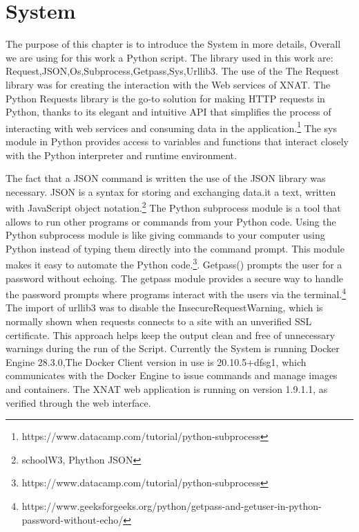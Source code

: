 \chapter{System}
The purpose of this chapter is to introduce the System in more details, Overall we are using for this work a Python script. The library  used in this work are: Request,JSON,Os,Subprocess,Getpass,Sys,Urllib3.
The use of the The Request library was for creating the interaction with the Web services of XNAT. The Python Requests library is the go-to solution for making HTTP requests in Python, thanks to its elegant and intuitive API that simplifies the process of interacting with web services and consuming data in the application.\footnote{https://www.datacamp.com/tutorial/python-subprocess} The sys module in Python provides access to variables and functions that interact closely with the Python interpreter and runtime environment. 

The fact that a JSON command is written the use of the JSON library was necessary. JSON is a syntax for storing and exchanging data.it a text, written with JavaScript object notation.\footnote{schoolW3, Phython JSON}
The Python subprocess module is a tool that allows to run other programs or commands from your Python code. Using the Python subprocess module is like giving commands to your computer using Python instead of typing them directly into the command prompt. This module makes it easy to automate the Python code.\footnote{https://www.datacamp.com/tutorial/python-subprocess}. Getpass() prompts the user for a password without echoing. The getpass module provides a secure way to handle the password prompts where programs interact with the users via the terminal.\footnote{https://www.geeksforgeeks.org/python/getpass-and-getuser-in-python-password-without-echo/}
 The import of urllib3 was to disable the InsecureRequestWarning, which is normally shown when requests connects to a site with an unverified SSL certificate. This approach helps keep the output clean and free of unnecessary warnings during the run of the Script.
 Currently the System is running Docker Engine 28.3.0,The Docker Client version in use is 20.10.5+dfsg1, which communicates with the Docker Engine to issue commands and manage images and containers. The XNAT web application is running on version 1.9.1.1, as verified through the web interface. 
 

